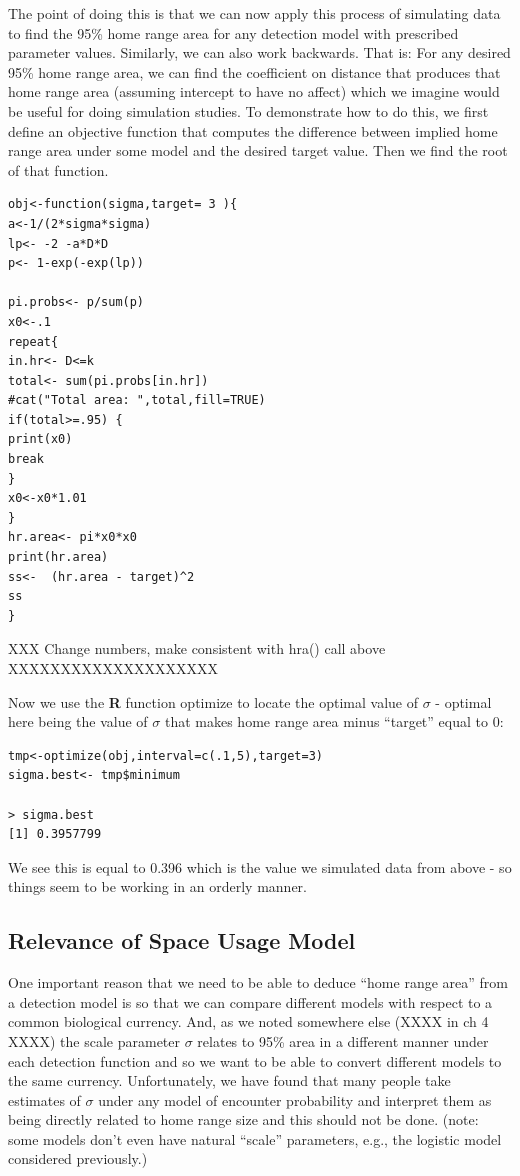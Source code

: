 The point of doing this is that we can now apply this process of
simulating data to find the 95\% home range area for any detection
model with prescribed parameter values.  Similarly, we can also work
backwards. That is: For any desired 95\% home range area, we can find
the coefficient on distance that produces that home range area
(assuming intercept to have no affect) which we imagine would be
useful for doing simulation studies. 
To demonstrate how to do this, 
we first 
define an objective function that computes the difference between 
implied home range area
under some model and the desired target value. Then we find the root
of that function.

\begin{verbatim}
obj<-function(sigma,target= 3 ){
a<-1/(2*sigma*sigma)
lp<- -2 -a*D*D
p<- 1-exp(-exp(lp))

pi.probs<- p/sum(p)
x0<-.1
repeat{
in.hr<- D<=k
total<- sum(pi.probs[in.hr])  
#cat("Total area: ",total,fill=TRUE)
if(total>=.95) {
print(x0)
break
}
x0<-x0*1.01
}
hr.area<- pi*x0*x0
print(hr.area)
ss<-  (hr.area - target)^2
ss
}
\end{verbatim}



XXX Change numbers, make consistent with hra() call above
XXXXXXXXXXXXXXXXXXXX 


Now we use the {\bf R} function optimize to locate the optimal value
of $\sigma$ - optimal here being the value of $\sigma$  that makes
home range area minus ``target''  equal to 0:
\begin{verbatim}
tmp<-optimize(obj,interval=c(.1,5),target=3)
sigma.best<- tmp$minimum

> sigma.best
[1] 0.3957799
\end{verbatim}

We see this is equal to 0.396 which is the value we simulated data from above - so things seem to be working in an orderly manner. 


\subsection{Relevance of Space Usage Model}

One important reason that we need to be able to deduce ``home range
area'' from a detection model is so that we can compare different
models with respect to a common biological currency. And, 
as we noted somewhere else (XXXX in ch 4 XXXX) the scale parameter $\sigma$
relates to 95\% area in a different manner under each detection
function and so we want to be able to convert different models to the
same currency. Unfortunately, we have found that many people take
estimates of $\sigma$ under any model of encounter probability and
interpret them as being directly related to home range size and this
should not be done. (note:
some models don't even have natural ``scale'' parameters, e.g., the
logistic model considered previously.)

